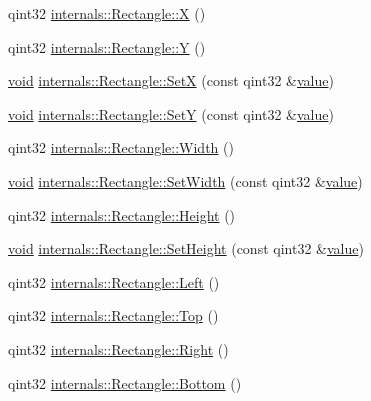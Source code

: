 \begin{DoxyCompactItemize}
\item 
qint32 \hyperlink{group___o_p_map_widget_ga95fc9b3e998dac5bc018066e5f59abf3}{internals\-::\-Rectangle\-::\-X} ()
\item 
qint32 \hyperlink{group___o_p_map_widget_ga6ca37907a3c1adef88ec18719e426391}{internals\-::\-Rectangle\-::\-Y} ()
\item 
\hyperlink{group___u_a_v_objects_plugin_ga444cf2ff3f0ecbe028adce838d373f5c}{void} \hyperlink{group___o_p_map_widget_ga22ba95479846a429af53aa19f149f5f3}{internals\-::\-Rectangle\-::\-Set\-X} (const qint32 \&\hyperlink{glext_8h_aa0e2e9cea7f208d28acda0480144beb0}{value})
\item 
\hyperlink{group___u_a_v_objects_plugin_ga444cf2ff3f0ecbe028adce838d373f5c}{void} \hyperlink{group___o_p_map_widget_gaea8a51114d79ece5fb59532867e15328}{internals\-::\-Rectangle\-::\-Set\-Y} (const qint32 \&\hyperlink{glext_8h_aa0e2e9cea7f208d28acda0480144beb0}{value})
\item 
qint32 \hyperlink{group___o_p_map_widget_ga1dcf3f71849a2534fe47d2db0fb5a317}{internals\-::\-Rectangle\-::\-Width} ()
\item 
\hyperlink{group___u_a_v_objects_plugin_ga444cf2ff3f0ecbe028adce838d373f5c}{void} \hyperlink{group___o_p_map_widget_gadf0be7cce382491567f5eceec5dbb0a2}{internals\-::\-Rectangle\-::\-Set\-Width} (const qint32 \&\hyperlink{glext_8h_aa0e2e9cea7f208d28acda0480144beb0}{value})
\item 
qint32 \hyperlink{group___o_p_map_widget_gaef58ba0ac7584cbe21ca8e4763187ffc}{internals\-::\-Rectangle\-::\-Height} ()
\item 
\hyperlink{group___u_a_v_objects_plugin_ga444cf2ff3f0ecbe028adce838d373f5c}{void} \hyperlink{group___o_p_map_widget_ga88adf48284c51b739196968be6fa880b}{internals\-::\-Rectangle\-::\-Set\-Height} (const qint32 \&\hyperlink{glext_8h_aa0e2e9cea7f208d28acda0480144beb0}{value})
\item 
qint32 \hyperlink{group___o_p_map_widget_ga63b6483e8a88de2d85d97e8d97477133}{internals\-::\-Rectangle\-::\-Left} ()
\item 
qint32 \hyperlink{group___o_p_map_widget_gaa6e68777faa43b088a20ae9e33b964dd}{internals\-::\-Rectangle\-::\-Top} ()
\item 
qint32 \hyperlink{group___o_p_map_widget_ga3d473ded37080d218c696415f34d7141}{internals\-::\-Rectangle\-::\-Right} ()
\item 
qint32 \hyperlink{group___o_p_map_widget_ga9c67095a9af32efd25d873638e82a4d6}{internals\-::\-Rectangle\-::\-Bottom} ()
\item 

\end{DoxyCompactItemize}
